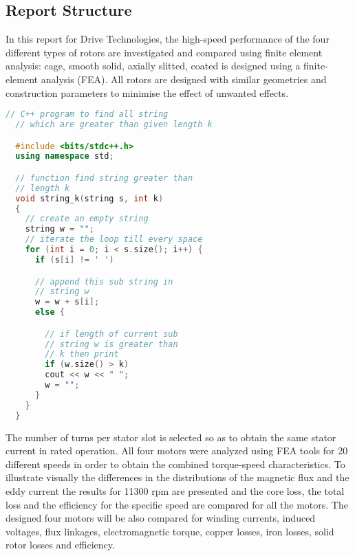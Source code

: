 \subsection{Report Structure} %

In this report for Drive Technologies, the high-speed performance of the four
different types of rotors are investigated and compared using finite element analysis:
cage, smooth solid, axially slitted, coated is designed using a finite-element
analysis (FEA). All rotors are designed with similar geometries and construction parameters
to minimise the effect of unwanted effects.

\begin{lstlisting}[language=C++]  
  // C++ program to find all string
  // which are greater than given length k 

  #include <bits/stdc++.h> 
  using namespace std;

  // function find string greater than
  // length k 
  void string_k(string s, int k) 
  {
    // create an empty string
    string w = "";
    // iterate the loop till every space
    for (int i = 0; i < s.size(); i++) {
      if (s[i] != ' ')

      // append this sub string in
      // string w
      w = w + s[i];
      else {

        // if length of current sub
        // string w is greater than 
        // k then print
        if (w.size() > k)
        cout << w << " "; 
        w = "";
      }
    }
  }
\end{lstlisting}

The number of turns per stator slot is selected so as to obtain the
same stator current in rated operation. All four motors were analyzed using FEA
tools for 20 different speeds in order to obtain the combined torque-speed
characteristics. To illustrate visually the differences in the distributions of the
magnetic flux and the eddy current the results for 11300 rpm are presented and the
core loss, the total loss and the efficiency for the specific speed are compared for all
the motors. The designed four motors will be also compared for winding currents,
induced voltages, flux linkages, electromagnetic torque, copper losses, iron losses,
solid rotor losses and efficiency.
